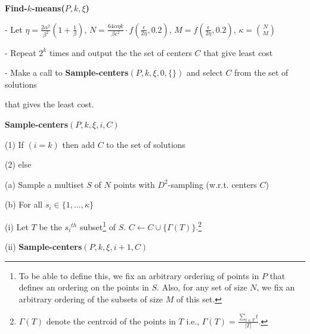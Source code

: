 \documentclass[11pt]{article}
\newcommand{\eps}{{\epsilon}}
\begin{document}
\begin{center}
\begin{Algorithm}[h]
\begin{boxedminipage}{6.5in}
{\bf Find-$k$-means($P, k, \xi$)}

\hspace{0.1in} - Let $\eta = \frac{2 \alpha^2}{\beta^2} \left(1+\frac{1}{\beta} \right)$, $N = \frac{64 \alpha \eta k}{\beta \eps^2} \cdot f \left( \frac{\eps}{2 \eta}, 0.2 \right)$, 
$M = f \left( \frac{\eps}{2 \eta}, 0.2 \right) $, $\kappa = \binom{N}{M}$

\hspace{0.1in} - Repeat $2^k$ times and output the the set of centers $C$ that give least cost

\hspace{0.3in} - Make a call to {\bf Sample-centers$(P, k, \xi, 0, \{\})$} and select $C$ from the set of solutions

\hspace{0.4in} that gives the least cost.

{\bf Sample-centers$(P, k, \xi, i, C)$}

\hspace{0.1in} (1) If $(i = k)$ then add $C$ to the set of solutions

\hspace{0.1in} (2) else

\hspace{0.3in} (a) Sample a multiset $S$ of $N$ points with $D^2$-sampling (w.r.t. centers $C$)

\hspace{0.3in} (b) For all $s_i \in \{1, ..., \kappa\}$

\hspace{0.5in} (i) Let $T$ be the ${s_i}^{th}$ subset\footnote{To be able to define this, we fix an arbitrary ordering of points in $P$ that defines an ordering on the points in $S$. 
Also, for any set of size $N$, we fix an arbitrary ordering of the subsets of size $M$ of this set. } of $S$. 
$C \leftarrow C \cup \{\Gamma(T)\}$.\footnote{$\Gamma(T)$ denote the centroid of the points in $T$ i.e., $\Gamma(T) = \frac{\sum_{t \in T} t}{|T|}$.}

\hspace{0.5in} (ii) {\bf Sample-centers$(P, k, \xi, i+1, C)$}
\end{boxedminipage}
\caption{{\bf Find-$k$-means($P, k, \eps$)} gives $(1+\eps)$-approximation for data sets $P \subseteq \mathcal{X}$, where the distance measure $D$ over $\mathcal{X}$ that satisfies $\alpha$-approximate triangle inequality, $\beta$-approximate symmetry, Centroid property, and $(f, \gamma, \delta)$-sampling property.}
\label{fig:k}
\end{Algorithm}
\end{center}
\end{document}

